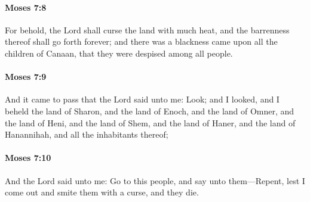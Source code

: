 		\paragraph{Moses 7:8} %
			\label{MOSES-7-8}

			For behold, the Lord shall curse the land with much heat, and the barrenness thereof shall go forth forever; and there was a blackness came upon all the children of Canaan, that they were despised among all people.


		\paragraph{Moses 7:9} %
			\label{MOSES-7-9}

			And it came to pass that the Lord said unto me: Look; and I looked, and I beheld the land of Sharon, and the land of Enoch, and the land of Omner, and the land of Heni, and the land of Shem, and the land of Haner, and the land of Hanannihah, and all the inhabitants thereof;


		\paragraph{Moses 7:10} %
			\label{MOSES-7-10}

			And the Lord said unto me: Go to this people, and say unto them---Repent, lest I come out and smite them with a curse, and they die.


